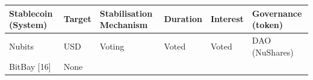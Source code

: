 \documentclass[english,]{IEEEtran}
\begin{document}
\begin{longtable}[]{@{}llllll@{}}
\toprule
\begin{minipage}[b]{0.27\columnwidth}\raggedright\strut
Stablecoin (System)\strut
\end{minipage} & \begin{minipage}[b]{0.06\columnwidth}\raggedright\strut
Target\strut
\end{minipage} & \begin{minipage}[b]{0.19\columnwidth}\raggedright\strut
Stabilisation Mechanism\strut
\end{minipage} & \begin{minipage}[b]{0.09\columnwidth}\raggedright\strut
Duration\strut
\end{minipage} & \begin{minipage}[b]{0.08\columnwidth}\raggedright\strut
Interest\strut
\end{minipage} & \begin{minipage}[b]{0.15\columnwidth}\raggedright\strut
Governance (token)\strut
\end{minipage}\tabularnewline
\midrule
\endhead
\begin{minipage}[t]{0.27\columnwidth}\raggedright\strut
Nubits\strut
\end{minipage} & \begin{minipage}[t]{0.06\columnwidth}\raggedright\strut
USD\strut
\end{minipage} & \begin{minipage}[t]{0.19\columnwidth}\raggedright\strut
Voting\strut
\end{minipage} & \begin{minipage}[t]{0.09\columnwidth}\raggedright\strut
Voted\strut
\end{minipage} & \begin{minipage}[t]{0.08\columnwidth}\raggedright\strut
Voted\strut
\end{minipage} & \begin{minipage}[t]{0.15\columnwidth}\raggedright\strut
DAO (NuShares)\strut
\end{minipage}\tabularnewline
\begin{minipage}[t]{0.27\columnwidth}\raggedright\strut
BitBay {[}16{]}\strut
\end{minipage} & \begin{minipage}[t]{0.06\columnwidth}\raggedright\strut
None\strut
\end{minipage} & \begin{minipage}[t]{0.19\columnwidth}\raggedright\strut

\end{minipage}
\end{longtable}
\end{document}
